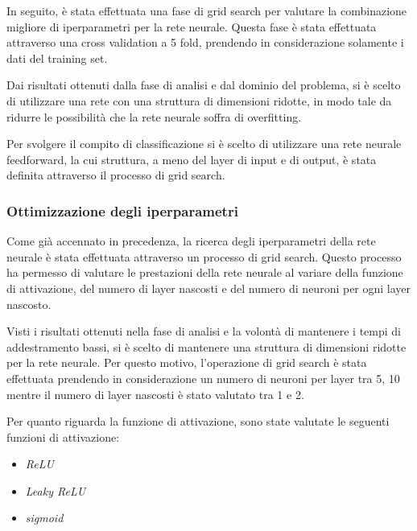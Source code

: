 In seguito, è stata effettuata una fase di grid search per valutare la combinazione
migliore di iperparametri per la rete neurale. Questa fase è stata effettuata
attraverso una cross validation a 5 fold, prendendo in considerazione solamente
i dati del training set.

Dai risultati ottenuti dalla fase di analisi e dal dominio del problema, si è
scelto di utilizzare una rete con una struttura di dimensioni ridotte, in modo
tale da ridurre le possibilità che la rete neurale soffra di overfitting.

Per svolgere il compito di classificazione si è scelto di utilizzare una rete
neurale feedforward, la cui struttura, a meno del layer di input e di output, è
stata definita attraverso il processo di grid search.
\subsubsection{Ottimizzazione degli iperparametri}
Come già accennato in precedenza, la ricerca degli iperparametri della rete neurale
è stata effettuata attraverso un processo di grid search. Questo processo ha
permesso di valutare le prestazioni della rete neurale al variare della funzione
di attivazione, del numero di layer nascosti e del numero di neuroni per ogni
layer nascosto.

Visti i risultati ottenuti nella fase di analisi e la volontà di mantenere i
tempi di addestramento bassi, si è scelto di mantenere una struttura di dimensioni
ridotte per la rete neurale. Per questo motivo, l'operazione di grid search è
stata effettuata prendendo in considerazione un numero di neuroni per layer
tra 5, 10 mentre il numero di layer nascosti è stato valutato tra 1 e 2.

Per quanto riguarda la funzione di attivazione, sono state valutate le seguenti
funzioni di attivazione:
\begin{itemize}
    \item \textit{ReLU}
    \item \textit{Leaky ReLU}
    \item \textit{sigmoid}
\end{itemize}

